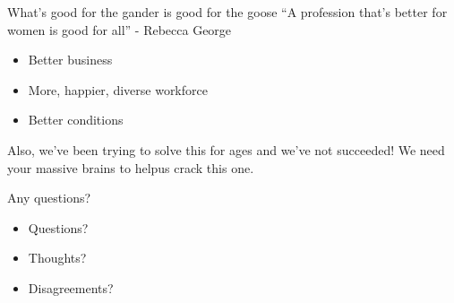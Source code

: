\documentclass[xcolor=table,aspectratio=169]{beamer}
\begin{document}
\begin{frame}{What's good for the gander is good for the goose}
	``A profession that's better for women is good for all'' - Rebecca George 

	\begin{itemize}
		\item Better business
		\item More, happier, diverse workforce
		\item Better conditions
	\end{itemize}
	\vspace{0.5em}

	Also, we've been trying to solve this for ages and we've not succeeded! We need your massive brains to helpus crack this one.

\end{frame}


\begin{frame}{Any questions?}

	\begin{itemize}
	\item Questions?
	\item Thoughts?
	\item Disagreements?
	\end{itemize}
\end{frame}
\end{document}
